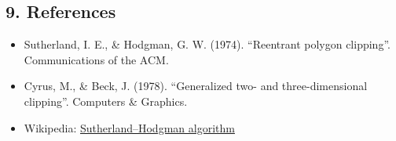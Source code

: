 \subsection{9. References}
\begin{itemize}
    \item Sutherland, I. E., \& Hodgman, G. W. (1974). ``Reentrant polygon clipping''. Communications of the ACM.
    \item Cyrus, M., \& Beck, J. (1978). ``Generalized two- and three-dimensional clipping''. Computers \& Graphics.
    \item Wikipedia: \href{https://en.wikipedia.org/wiki/Sutherland%E2%80%93Hodgman_algorithm}{Sutherland--Hodgman algorithm}
\end{itemize}
